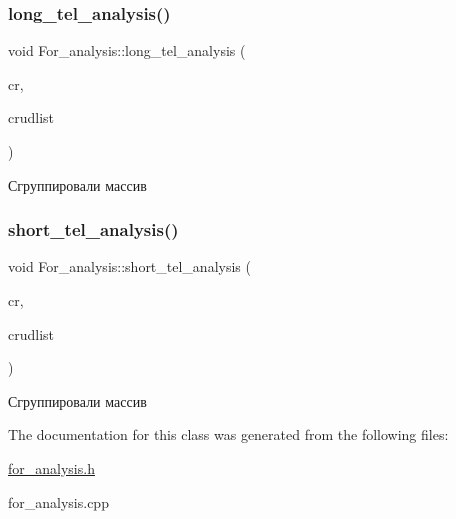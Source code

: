 \subsubsection{\texorpdfstring{long\_tel\_analysis()}{long\_tel\_analysis()}}
{\footnotesize\ttfamily void For\+\_\+analysis\+::long\+\_\+tel\+\_\+analysis (\begin{DoxyParamCaption}\item[{\mbox{\hyperlink{class_crud}{Crud}} $\ast$}]{cr,  }\item[{Q\+List$<$ \mbox{\hyperlink{class_crud}{Crud}} $\ast$ $>$ $\ast$}]{crudlist }\end{DoxyParamCaption})}

Сгруппировали массив \mbox{\label{class_for__analysis_ae9aabdb8bb40a43b96e046cb2781fd72}} 
\subsubsection{\texorpdfstring{short\_tel\_analysis()}{short\_tel\_analysis()}}
{\footnotesize\ttfamily void For\+\_\+analysis\+::short\+\_\+tel\+\_\+analysis (\begin{DoxyParamCaption}\item[{\mbox{\hyperlink{class_crud}{Crud}} $\ast$}]{cr,  }\item[{Q\+List$<$ \mbox{\hyperlink{class_crud}{Crud}} $\ast$ $>$ $\ast$}]{crudlist }\end{DoxyParamCaption})}

Сгруппировали массив 

The documentation for this class was generated from the following files\+:\begin{DoxyCompactItemize}
\item 
\mbox{\hyperlink{for__analysis_8h}{for\+\_\+analysis.\+h}}\item 
for\+\_\+analysis.\+cpp\end{DoxyCompactItemize}
